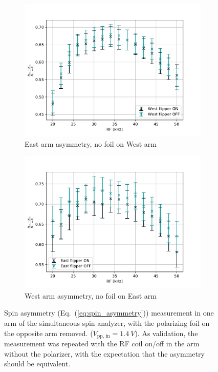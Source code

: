 \begin{figure}
\centering
\begin{subfigure}{.5\textwidth} 
  \centering
  \includegraphics[width=\textwidth]{figures/SSA_east_arm_no_west_foil.pdf}
  \caption{East arm asymmetry, no foil on West arm }\label{subfig:SSA_east_arm_no_west_foil}
\end{subfigure}%
\begin{subfigure}{.5\textwidth}
  \centering
  \includegraphics[width=\textwidth]{figures/SSA_west_arm_no_west_foil.pdf}
  \caption{West arm asymmetry, no foil on East arm}\label{subfig:SSA_west_arm_no_west_foil}
\end{subfigure}
\caption
    {Spin asymmetry (Eq.~(\ref{eq:spin_asymmetry})) measurement in one arm of the simultaneous spin analyzer, with the polarizing foil on the opposite arm removed. ($V_\text{pp, in}=\qty{1.4}{V}$). As validation, the measurement was repeated with the RF coil on/off in the arm without the polarizer, with the expectation that the asymmetry should be equivalent.}
\label{fig:SSA_asym_one_foil_out}
\end{figure}

